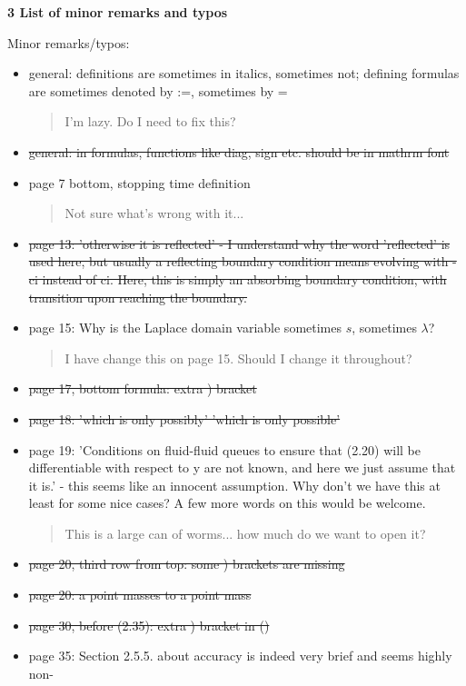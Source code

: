 \documentclass[a4paper]{article}
\begin{document}
\textbf{3 List of minor remarks and typos}

Minor remarks/typos:
\begin{itemize}
\item general: definitions are sometimes in italics, sometimes not; defining formulas are
sometimes denoted by :=, sometimes by =
\begin{quote}
    I'm lazy. Do I need to fix this?
\end{quote}
\item \st{general: in formulas, functions like diag, sign etc. should be in mathrm font}
\item page 7 bottom, stopping time definition
\begin{quote}
    Not sure what's wrong with it...
\end{quote}
\item \st{page 13: 'otherwise it is reflected' - I understand why the word 'reflected' is used here, but usually a reflecting boundary condition means evolving with -ci instead of ci. Here, this is simply an absorbing boundary condition, with transition upon reaching the boundary.}
\item page 15: Why is the Laplace domain variable sometimes \(s\), sometimes \(\lambda\)?
\begin{quote}
    I have change this on page 15. Should I change it throughout?
\end{quote}
\item \st{page 17, bottom formula: extra ) bracket}
\item \st{page 18: 'which is only possibly'  'which is only possible'}
\item page 19: 'Conditions on fluid-fluid queues to ensure that (2.20) will be differentiable with respect to y are not known, and here we just assume that it is.' - this seems like an innocent assumption. Why don't we have this at least for some nice cases? A few more words on this would be welcome.
\begin{quote}
    This is a large can of worms... how much do we want to open it?
\end{quote}
\item \st{page 20, third row from top: some ) brackets are missing}
\item \st{page 20: a point masses to a point mass}
\item \st{page 30, before (2.35): extra ) bracket in ()}
\item page 35: Section 2.5.5. about accuracy is indeed very brief and seems highly non-

\end{itemize}
\end{document}
